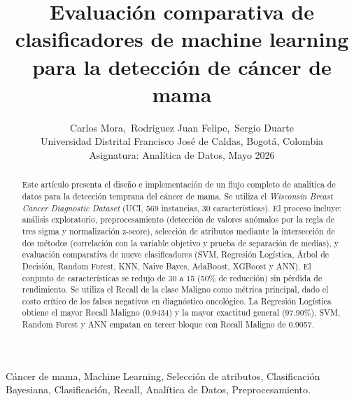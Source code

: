 \documentclass[journal]{IEEEtran}
\begin{document}
\title{Evaluación comparativa de clasificadores de machine learning\\
para la detección de cáncer de mama}

\author{Carlos Mora,~Rodriguez Juan Felipe,~Sergio Duarte\\
{\small Universidad Distrital Francisco José de Caldas, Bogotá, Colombia}\\
{\small Asignatura: Analítica de Datos, Mayo 2026}}


\maketitle

\begin{abstract}
Este artículo presenta el diseño e implementación de un flujo completo de analítica de datos para la detección temprana del cáncer de mama. Se utiliza el \textit{Wisconsin Breast Cancer Diagnostic Dataset} (UCI, 569 instancias, 30 características). El proceso incluye: análisis exploratorio, preprocesamiento (detección de valores anómalos por la regla de tres sigma y normalización z-score), selección de atributos mediante la intersección de dos métodos (correlación con la variable objetivo y prueba de separación de medias), y evaluación comparativa de nueve clasificadores (SVM, Regresión Logística, Árbol de Decisión, Random Forest, KNN, Naive Bayes, AdaBoost, XGBoost y ANN). El conjunto de características se redujo de 30 a 15 (50\% de reducción) sin pérdida de rendimiento. Se utiliza el Recall de la clase Maligno como métrica principal, dado el costo crítico de los falsos negativos en diagnóstico oncológico. La Regresión Logística obtiene el mayor Recall Maligno (0.9434) y la mayor exactitud general (97.90\%). SVM, Random Forest y ANN empatan en tercer bloque con Recall Maligno de 0.9057.
\end{abstract}

\begin{IEEEkeywords}
Cáncer de mama, Machine Learning, Selección de atributos, Clasificación Bayesiana, Clasificación, Recall, Analítica de Datos, Preprocesamiento.
\end{IEEEkeywords}
\end{document}
